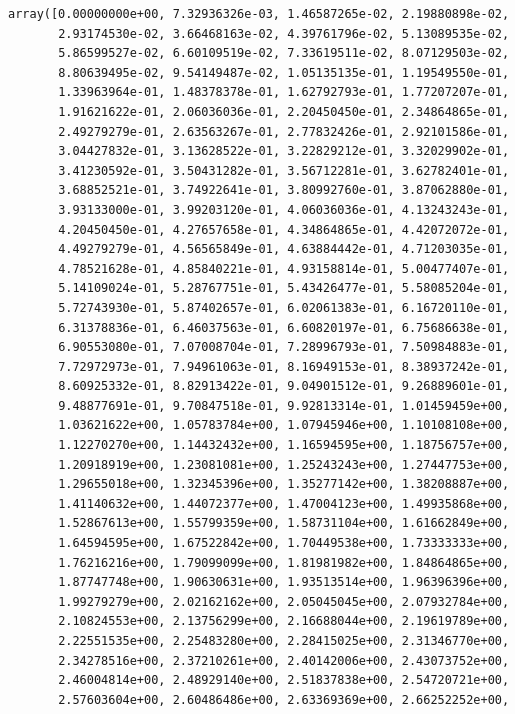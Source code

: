 \documentclass[
  letterpaper,
]{scrreprt}
\begin{document}
\begin{verbatim}
array([0.00000000e+00, 7.32936326e-03, 1.46587265e-02, 2.19880898e-02,
       2.93174530e-02, 3.66468163e-02, 4.39761796e-02, 5.13089535e-02,
       5.86599527e-02, 6.60109519e-02, 7.33619511e-02, 8.07129503e-02,
       8.80639495e-02, 9.54149487e-02, 1.05135135e-01, 1.19549550e-01,
       1.33963964e-01, 1.48378378e-01, 1.62792793e-01, 1.77207207e-01,
       1.91621622e-01, 2.06036036e-01, 2.20450450e-01, 2.34864865e-01,
       2.49279279e-01, 2.63563267e-01, 2.77832426e-01, 2.92101586e-01,
       3.04427832e-01, 3.13628522e-01, 3.22829212e-01, 3.32029902e-01,
       3.41230592e-01, 3.50431282e-01, 3.56712281e-01, 3.62782401e-01,
       3.68852521e-01, 3.74922641e-01, 3.80992760e-01, 3.87062880e-01,
       3.93133000e-01, 3.99203120e-01, 4.06036036e-01, 4.13243243e-01,
       4.20450450e-01, 4.27657658e-01, 4.34864865e-01, 4.42072072e-01,
       4.49279279e-01, 4.56565849e-01, 4.63884442e-01, 4.71203035e-01,
       4.78521628e-01, 4.85840221e-01, 4.93158814e-01, 5.00477407e-01,
       5.14109024e-01, 5.28767751e-01, 5.43426477e-01, 5.58085204e-01,
       5.72743930e-01, 5.87402657e-01, 6.02061383e-01, 6.16720110e-01,
       6.31378836e-01, 6.46037563e-01, 6.60820197e-01, 6.75686638e-01,
       6.90553080e-01, 7.07008704e-01, 7.28996793e-01, 7.50984883e-01,
       7.72972973e-01, 7.94961063e-01, 8.16949153e-01, 8.38937242e-01,
       8.60925332e-01, 8.82913422e-01, 9.04901512e-01, 9.26889601e-01,
       9.48877691e-01, 9.70847518e-01, 9.92813314e-01, 1.01459459e+00,
       1.03621622e+00, 1.05783784e+00, 1.07945946e+00, 1.10108108e+00,
       1.12270270e+00, 1.14432432e+00, 1.16594595e+00, 1.18756757e+00,
       1.20918919e+00, 1.23081081e+00, 1.25243243e+00, 1.27447753e+00,
       1.29655018e+00, 1.32345396e+00, 1.35277142e+00, 1.38208887e+00,
       1.41140632e+00, 1.44072377e+00, 1.47004123e+00, 1.49935868e+00,
       1.52867613e+00, 1.55799359e+00, 1.58731104e+00, 1.61662849e+00,
       1.64594595e+00, 1.67522842e+00, 1.70449538e+00, 1.73333333e+00,
       1.76216216e+00, 1.79099099e+00, 1.81981982e+00, 1.84864865e+00,
       1.87747748e+00, 1.90630631e+00, 1.93513514e+00, 1.96396396e+00,
       1.99279279e+00, 2.02162162e+00, 2.05045045e+00, 2.07932784e+00,
       2.10824553e+00, 2.13756299e+00, 2.16688044e+00, 2.19619789e+00,
       2.22551535e+00, 2.25483280e+00, 2.28415025e+00, 2.31346770e+00,
       2.34278516e+00, 2.37210261e+00, 2.40142006e+00, 2.43073752e+00,
       2.46004814e+00, 2.48929140e+00, 2.51837838e+00, 2.54720721e+00,
       2.57603604e+00, 2.60486486e+00, 2.63369369e+00, 2.66252252e+00,

\end{verbatim}
\end{document}
